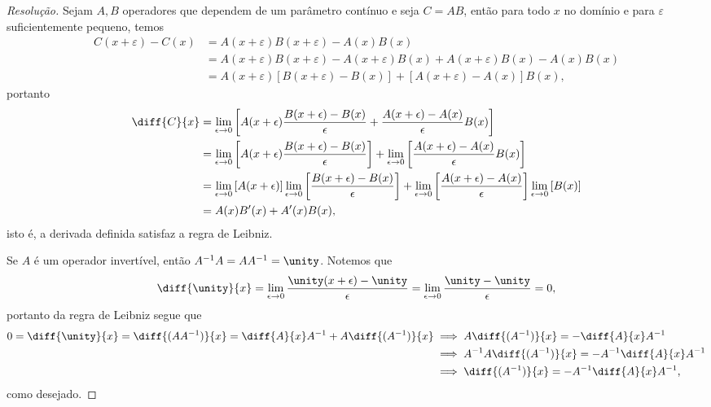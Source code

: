 \begin{proof}[Resolução]
    Sejam \(A, B\) operadores que dependem de um parâmetro contínuo e seja \(C = AB\), então para todo \(x\) no domínio e para \(\varepsilon\) suficientemente pequeno, temos
    \begin{align*}
       C(x + \varepsilon) - C(x) &= A(x + \varepsilon)B(x + \varepsilon) - A(x) B(x)\\
                                 &= A(x + \varepsilon) B(x + \varepsilon) - A(x + \varepsilon) B(x) + A(x + \varepsilon) B(x) - A(x) B(x)\\
                                 &= A(x + \varepsilon) \left[B(x + \varepsilon) - B(x)\right] + \left[A(x + \varepsilon) - A(x)\right]B(x),
    \end{align*}
    portanto
    \begin{align*}
       \diff{C}{x} &= \lim_{\epsilon \to 0}{\left[A(x + \epsilon) \frac{B(x + \epsilon) - B(x)}{\epsilon} + \frac{A(x + \epsilon) - A(x)}{\epsilon} B(x)\right]}\\
                   &= \lim_{\epsilon \to 0}{\left[A(x + \epsilon) \frac{B(x + \epsilon) - B(x)}{\epsilon}\right]} + \lim_{\epsilon \to 0}{\left[\frac{A(x + \epsilon) - A(x)}{\epsilon} B(x)\right]}\\
                   &= \lim_{\epsilon \to 0}{\left[A(x + \epsilon)\right]}\lim_{\epsilon \to 0}{\left[\frac{B(x + \epsilon) - B(x)}{\epsilon}\right]} + \lim_{\epsilon \to 0}{\left[\frac{A(x + \epsilon) - A(x)}{\epsilon}\right]}\lim_{\epsilon \to 0}{\left[B(x)\right]}\\
                   &= A(x) B'(x) + A'(x)B(x),
    \end{align*}
    isto é, a derivada definida satisfaz a regra de Leibniz.

    Se \(A\) é um operador invertível, então \(A^{-1} A = A A^{-1} = \unity\). Notemos que
    \begin{equation*}
       \diff{\unity}{x} = \lim_{\epsilon \to 0}{\frac{\unity(x + \epsilon) - \unity}{\epsilon}} = \lim_{\epsilon \to 0}{\frac{\unity - \unity}{\epsilon}} = 0,
    \end{equation*}
    portanto da regra de Leibniz segue que
    \begin{align*}
       0 = \diff{\unity}{x} = \diff{(AA^{-1})}{x} = 
       \diff{A}{x} A^{-1} + A \diff{(A^{-1})}{x} &\implies A \diff{(A^{-1})}{x} = - \diff{A}{x} A^{-1}\\
                                                 &\implies A^{-1} A \diff{(A^{-1})}{x} = - A^{-1} \diff{A}{x} A^{-1}\\
                                                 &\implies \diff{(A^{-1})}{x} = - A^{-1} \diff{A}{x} A^{-1},
    \end{align*}
    como desejado.
\end{proof}
